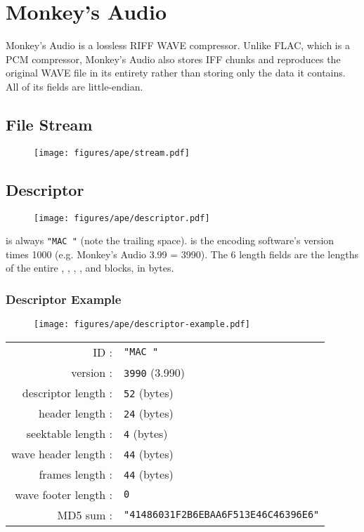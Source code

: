 
\chapter{Monkey's Audio}
Monkey's Audio is a lossless RIFF WAVE compressor.
Unlike FLAC, which is a PCM compressor, Monkey's Audio also stores
IFF chunks and reproduces the original WAVE file in its entirety rather
than storing only the data it contains.
All of its fields are little-endian.

\section{File Stream}
\begin{figure}[h]
\texttt{[image: figures/ape/stream.pdf]}
\end{figure}

\clearpage

\section{Descriptor}
\begin{figure}[h]
\texttt{[image: figures/ape/descriptor.pdf]}
\end{figure}
\par
\noindent
{} is always \texttt{"MAC "} (note the trailing space).
 is the encoding software's version times 1000
(e.g. Monkey's Audio 3.99 = 3990).
The 6 length fields are the lengths of the entire
, , ,
,  and  blocks,
in bytes.

\subsection{Descriptor Example}
\begin{figure}[h]
\texttt{[image: figures/ape/descriptor-example.pdf]}
\end{figure}
\begin{table}[h]
\begin{tabular}{rl}
ID : & \texttt{"MAC "} \\
version : & \texttt{3990} (3.990) \\
descriptor length : & \texttt{52} (bytes)\\
header length : & \texttt{24} (bytes)\\
seektable length : & \texttt{4} (bytes) \\
wave header length : & \texttt{44} (bytes) \\
frames length : & \texttt{44} (bytes) \\
wave footer length : & \texttt{0} \\
MD5 sum : & \texttt{"41486031F2B6EBAA6F513E46C46396E6"}
\end{tabular}
\end{table}

